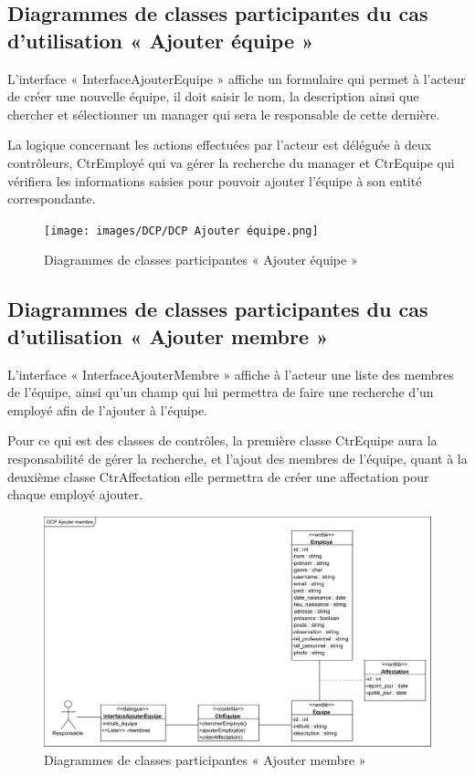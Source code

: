         \subsection*{Diagrammes de classes participantes du cas d'utilisation « Ajouter équipe »}
        L’interface « InterfaceAjouterEquipe » affiche un formulaire qui permet à l’acteur de créer une nouvelle équipe, il doit saisir le nom, la description ainsi que chercher et sélectionner un manager qui sera le responsable de cette dernière.
        
        La logique concernant les actions effectuées par l’acteur est déléguée à deux contrôleurs, CtrEmployé qui va gérer la recherche du manager et CtrEquipe qui vérifiera les informations saisies pour pouvoir ajouter l’équipe à son entité correspondante.
        \clearpage
            \begin{figure}[h!]
                 \centering
                \texttt{[image: images/DCP/DCP Ajouter équipe.png]}
                 \caption{Diagrammes de classes participantes « Ajouter équipe »}
                 \label{fig29}
            \end{figure}
            
        \subsection*{Diagrammes de classes participantes du cas d'utilisation « Ajouter membre »}
        L’interface « InterfaceAjouterMembre » affiche à l’acteur une liste des membres de l’équipe, ainsi qu’un champ qui lui permettra de faire une recherche d’un employé afin de l’ajouter à l’équipe.
        
        Pour ce qui est des classes de contrôles, la première classe CtrEquipe aura la responsabilité de gérer la recherche, et l’ajout des membres de l’équipe, quant à la deuxième classe CtrAffectation elle permettra de créer une affectation pour chaque employé ajouter.
        \clearpage
            \begin{figure}[h!]
                 \centering
                \includegraphics[scale=0.72]{images/DCP/DCP Ajouter membre.png}
                 \caption{Diagrammes de classes participantes « Ajouter membre »}
                 \label{fig30}
            \end{figure}
            
